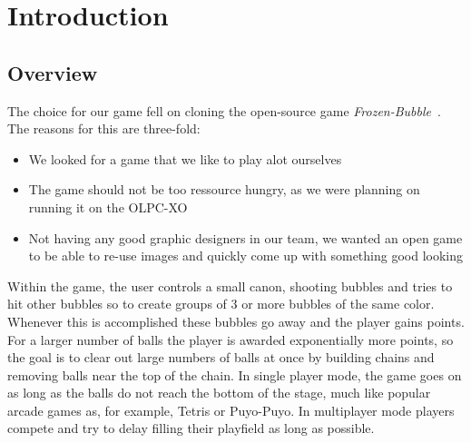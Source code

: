 \section{Introduction}
\subsection{Overview}
%
The choice for our game fell on cloning the open-source game \emph{Frozen-Bubble}~\cite{website:frozenbubble}. The reasons 
for this are three-fold:
%
\begin{itemize}
  \item We looked for a game that we like to play alot ourselves
  \item The game should not be too ressource hungry, as we were planning
    on running it on the OLPC-XO
  \item Not having any good graphic designers in our team, we wanted an
    open game to be able to re-use images and quickly come up with something
    good looking
\end{itemize}
%
Within the game, the user controls a small canon, shooting bubbles and tries to 
hit other bubbles so to create groups of 3 or more bubbles of the same color. 
Whenever this is accomplished these bubbles go away and the player gains points. 
For a larger number of balls the 
player is awarded exponentially more points, so the goal is to clear out large numbers 
of balls at once by building chains and removing balls near the top of the chain.
In single player mode, the game goes on as long as the balls do not reach the bottom 
of the stage, much like popular arcade games as, for example, Tetris or Puyo-Puyo.
In multiplayer mode players compete and try to delay filling their playfield 
as long as possible.
%
